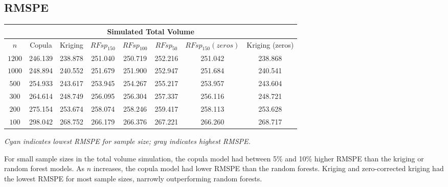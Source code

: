 \documentclass{article}
\begin{document}
\subsection{RMSPE}
\begin{singlespace}
	\begin{center}
	\begin{tabular}{|| c | c c c c c c c ||}
	\hline
	\multicolumn{8}{||c||}{Simulated Total Volume} \\
	\hline
	$n$ & Copula & Kriging & $RFsp_{150}$ & $RFsp_{100}$ & $RFsp_{50}$ & $RFsp_{150}(zeros)$ & Kriging (zeros) \\ [.5ex] 
	\hline\hline
	$1200$ & 246.139 & 238.878 & 251.040 & 250.719 & \cellcolor{gray}252.216 & 251.042 & \cellcolor{cyan}238.868 \\
	$1000$ & 248.894 & 240.552 & 251.679 & 251.900 & \cellcolor{gray}252.947 & 251.684 & \cellcolor{cyan}240.541 \\
	$500$ & 254.933 & 243.617 & 253.945 & 254.267 & \cellcolor{gray}255.217 & 253.957 & \cellcolor{cyan}243.604 \\
	$300$ & \cellcolor{gray}264.614 & 248.749 & 256.095 & 256.304 & 257.337 & 256.116 & \cellcolor{cyan}248.721 \\
	$200$ & \cellcolor{gray}275.154 & 253.674 & 258.074 & 258.246 & 259.417 & 258.113 & \cellcolor{cyan}253.628 \\
	$100$ & \cellcolor{gray}298.042 & 268.752 & \cellcolor{cyan}266.179 & 266.376 & 267.221 & 266.260 & 268.717 \\ [.5ex] 
	\hline
	\end{tabular}
	\vspace{.06cm}

	\textit{Cyan indicates lowest RMSPE for sample size; gray indicates highest RMSPE.}
	\end{center}
\end{singlespace}
For small sample sizes in the total volume simulation, the copula model had between 5\% and 10\% higher RMSPE than the kriging or random forest models.
As $n$ increases, the copula model had lower RMSPE than the random forests.
Kriging and zero-corrected kriging had the lowest RMSPE for most sample sizes, narrowly outperforming random forests.
\end{document}
